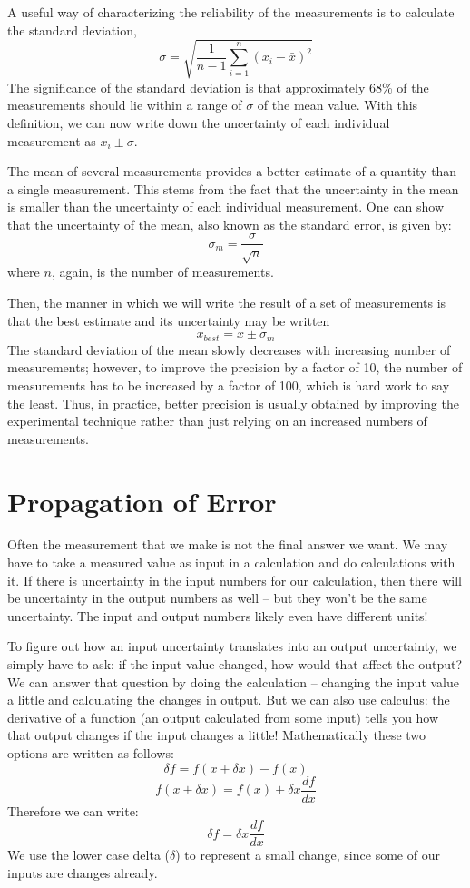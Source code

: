 A useful way of characterizing the reliability of the measurements is to calculate the standard deviation,
\[ \sigma = \sqrt{\frac{1}{n-1} \sum_{i=1}^{n}(x_{i}-\bar{x})^{2}} \]
The	significance of the standard deviation is that approximately 68\% of the measurements should lie within a range of $\sigma$ of the mean value.
With this definition, we can now write down the uncertainty of each individual measurement as $x_{i} \pm \sigma$.

The	mean of several measurements provides a better estimate of a quantity than a single measurement.
This stems from the fact that the uncertainty in the mean is smaller than the uncertainty of each individual measurement.
One can show that the uncertainty of the mean, also known as the standard error, is given by:
\[ \sigma_{m} = \frac{\sigma}{\sqrt{n}} \]
where $n$, again, is the number of measurements.

Then, the manner in which we will write the result of a set of measurements is that the best estimate and its uncertainty may be written
\[ x_{best} = \bar{x} \pm \sigma_{m} \]
The standard deviation of the mean slowly decreases with increasing number of  measurements; however, to improve the precision by a factor of 10, the number of measurements has to be increased by a factor of 100, which is hard work to say the least.
Thus, in practice, better precision is usually obtained by improving the experimental technique rather than just relying on an increased numbers of measurements.

\section*{Propagation of Error}
Often the measurement that we make is not the final answer we want. 
We may have to take a measured value as input in a calculation and do calculations with it. 
If there is uncertainty in the input numbers for our calculation, then there will be uncertainty in the output numbers as well – but they won't be the same uncertainty. 
The input and output numbers likely even have different units!
\par
To figure out how an input uncertainty translates into an output uncertainty, we simply have to ask: if the input value changed, how would that affect the output? 
We can answer that question by doing the calculation – changing the input value a little and calculating the changes in output. 
But we can also use calculus: the derivative of a function (an output calculated from some input) tells you how that output changes if the input changes a little! 
Mathematically these two options are written as follows:
\begin{equation}
\delta f = f(x + \delta x) - f(x)
\end{equation}
\begin{equation}
f(x + \delta x) = f(x) + \delta x \frac{df}{dx}
\end{equation}
Therefore we can write:
\begin{equation}
\delta f = \delta x \frac{df}{dx}
\end{equation}
We use the lower case delta ($\delta$) to represent a small change, since some of our inputs are changes already. 

